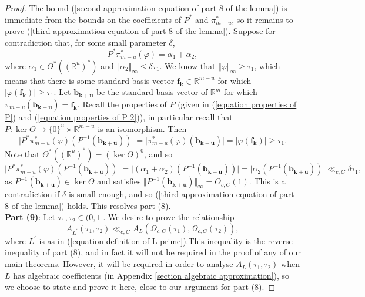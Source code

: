 \documentclass[12pt,a4paper,twoside,reqno]{amsart}
\numberwithin{equation}{section}
\begin{document}
\begin{proof}
The bound (\ref{second approximation equation of part 8 of the lemma}) is immediate from the bounds on the coefficients of $P^*$ and $\pi_{m-u}^*$, so it remains to prove (\ref{third approximation equation of part 8 of the lemma}). Suppose for contradiction that, for some small parameter $\delta$, \[P^*\pi_{m-u}^*(\varphi) = \alpha_1 + \alpha_2,\] where $\alpha_1 \in \Theta^*((\mathbb{R}^{u})^*)$ and $\Vert \alpha_2 \Vert_\infty \leqslant \delta \tau_1$. We know that $\Vert \varphi \Vert_\infty \geqslant \tau_1$, which means that there is some standard basis vector $\mathbf{f_k} \in \mathbb{R}^{m-u}$ for which $\vert \varphi(\mathbf{f_k})\vert \geqslant \tau_1$. Let $\mathbf{b_{k+u}}$ be the standard basis vector of $\mathbb{R}^m$ for which $\pi_{m-u}(\mathbf{b_{k+u}}) = \mathbf{f_k}$. Recall the properties of $P$ (given in (\ref{equation properties of P}) and (\ref{equation properties of P 2})), in particular recall that $P:\ker \Theta \longrightarrow \{0\}^u \times \mathbb{R}^{m-u}$ is an isomorphism. Then \[\vert P^* \pi_{m-u}^*(\varphi)(P^{-1}(\mathbf{b_{k+u}}))\vert = \vert\pi_{m-u}^*(\varphi)(\mathbf{b_{k+u}})\vert = \vert \varphi(\mathbf{f_k})\vert \geqslant \tau_1.\] Note that $\Theta^*((\mathbb{R}^{u})^*) = (\ker \Theta)^{0}$, and so \[\vert P^* \pi_{m-u}^*(\varphi)(P^{-1}(\mathbf{b_{k+u}}))\vert = \vert(\alpha_1 + \alpha_2)(P^{-1}(\mathbf{b_{k+u}}))\vert = \vert \alpha_2(P^{-1}(\mathbf{b_{k+u}})) \vert \ll_{c,C} \delta \tau_1,\] as $P^{-1}(\mathbf{b_{k+u}}) \in \ker \Theta$ and satisfies $\Vert P^{-1}(\mathbf{b_{k+u}})\Vert_\infty = O_{c,C}(1)$. This is a contradiction if $\delta$ is small enough, and so (\ref{third approximation equation of part 8 of the lemma}) holds. This resolves part (8).\\

\textbf{Part (9)}: Let $\tau_1,\tau_2 \in (0,1]$. We desire to prove the relationship 
\begin{equation}
\label{claim of part 9}
A_{L^\prime}(\tau_1,\tau_2) \ll_{c,C} A_L(\Omega_{c,C}(\tau_1),\Omega_{c,C}(\tau_2)),
\end{equation}
\noindent where $L^\prime$ is as in (\ref{equation definition of L prime}).This inequality is the reverse inequality of part (8), and in fact it will not be required in the proof of any of our main theorems. However, it will be required in order to analyse $A_L(\tau_1,\tau_2)$ when $L$ has algebraic coefficients (in Appendix \ref{section algebraic approximation}), so we choose to state and prove it here, close to our argument for part (8).


\end{proof}
\end{document}
